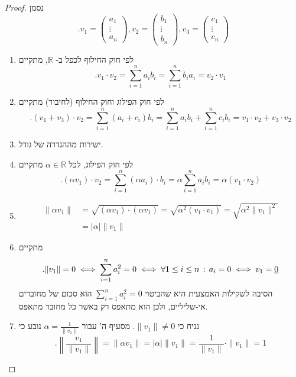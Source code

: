 \documentclass[12pt]{report}
\theoremstyle{plain}
\theoremstyle{definition}
\newcommand{\R}{\mathbb{R}}
\newcommand{\0}{\mathbf{0}}
\begin{document}
\begin{proof}
נסמן
$$
.v_1=\begin{pmatrix}
    a_1 \\
    \vdots \\
    a_n 
    \end{pmatrix},v_2=\begin{pmatrix}
    b_1 \\
    \vdots \\
    b_n 
    \end{pmatrix}, v_3=\begin{pmatrix}
    c_1 \\
    \vdots \\
    c_n 
    \end{pmatrix}
$$

\begin{enumerate}[label=\alph*.]
\item 
לפי חוק החילוף לכפל ב-
$\R$,
מתקיים
$$
.v_1\cdot v_2=\sum_{i=1}^n a_i b_i=\sum_{i=1}^n b_i a_i=v_2\cdot v_1
$$


\item 
לפי חוק הפילוג וחוק החילוף (לחיבור) מתקיים
$$
.(v_1+v_3)\cdot v_2=\sum_{i=1}^n (a_i+c_i)b_i=\sum_{i=1}^n a_ib_i+\sum_{i=1}^n c_ib_i=v_1\cdot v_2+v_3\cdot v_2
$$


\item 
ישירות מההגדרה של גודל.


\item
לפי חוק הפילוג, לכל
$\alpha\in\R$
מתקיים
$$
.(\alpha v_1)\cdot v_2=\sum_{i=1}^n (\alpha a_i)\cdot b_i=\alpha\sum_{i=1}^n a_ib_i=\alpha (v_1\cdot v_2)
$$


\item 
$$
\begin{aligned}
\|\alpha v_1\|&=\sqrt{(\alpha v_1)\cdot(\alpha v_1)}=\sqrt{\alpha^2(v_1\cdot v_1)}=\sqrt{\alpha^2\|v_1\|^2}\\
&=|\alpha|\|v_1\|
\end{aligned}
$$

\item
מתקיים
$$
.\|v_1\|=0 \iff \sum_{i=1}^n a_i^2=0 \iff \forall 1\leq i\leq n\thinspace:\thinspace a_i=0 \iff v_1=\underline{0}
$$
הסיבה לשקילות האמצעית היא שהביטוי 
$\sum_{i=1}^n a_i^2=0$
הוא סכום של מחוברים אי-שליליים, ולכן הוא מתאפס רק באשר כל מחובר מתאפס.

\item 
נניח כי
$\|v_1\|\neq 0$.
מסעיף ה' עבור
$\alpha=\frac{1}{\|v_1\|}$
נובע כי
$$
.\left\|\frac{v_1}{\|v_1\|}\right\|=\|\alpha v_1\|=|\alpha|\|v_1\|=\frac{1}{\|v_1\|}\cdot \|v_1\|=1
$$


\end{enumerate}
\end{proof}
\end{document}
